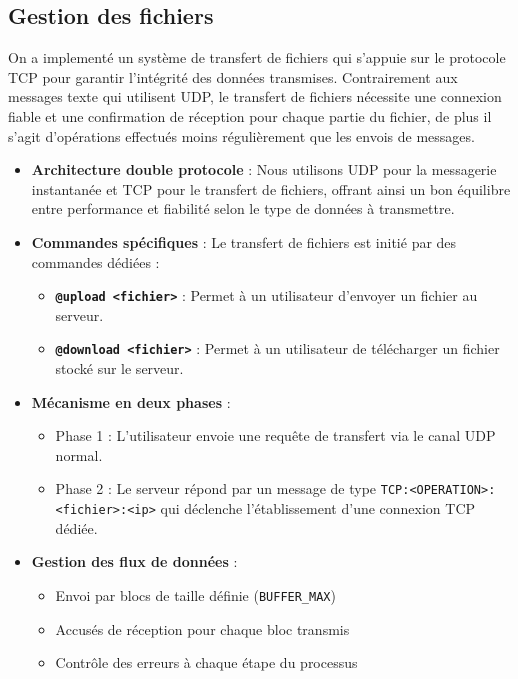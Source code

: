 \documentclass{cs-moi}
\begin{document}
\subsection{Gestion des fichiers}
On a implementé un système de transfert de fichiers qui s'appuie sur le protocole TCP pour garantir l'intégrité des données transmises. Contrairement aux messages texte qui utilisent UDP, le transfert de fichiers nécessite une connexion fiable et une confirmation de réception pour chaque partie du fichier, de plus il s'agit d'opérations effectués moins régulièrement que les envois de messages.

\begin{itemize}
    \item \textbf{Architecture double protocole} : Nous utilisons UDP pour la messagerie instantanée et TCP pour le transfert de fichiers, offrant ainsi un bon équilibre entre performance et fiabilité selon le type de données à transmettre.
    
    \item \textbf{Commandes spécifiques} : Le transfert de fichiers est initié par des commandes dédiées :
    \begin{itemize}
        \item \texttt{\textbf{@upload <fichier>}} : Permet à un utilisateur d'envoyer un fichier au serveur.
        \item \texttt{\textbf{@download <fichier>}} : Permet à un utilisateur de télécharger un fichier stocké sur le serveur.
    \end{itemize}
    
    \item \textbf{Mécanisme en deux phases} : 
    \begin{itemize}
        \item Phase 1 : L'utilisateur envoie une requête de transfert via le canal UDP normal.
        \item Phase 2 : Le serveur répond par un message de type \texttt{TCP:<OPERATION>:<fichier>:<ip>} qui déclenche l'établissement d'une connexion TCP dédiée.
    \end{itemize}
    
    \item \textbf{Gestion des flux de données} : 
    \begin{itemize}
        \item Envoi par blocs de taille définie (\texttt{BUFFER\_MAX})
        \item Accusés de réception pour chaque bloc transmis
        \item Contrôle des erreurs à chaque étape du processus
    \end{itemize}
        

\end{itemize}
\end{document}
